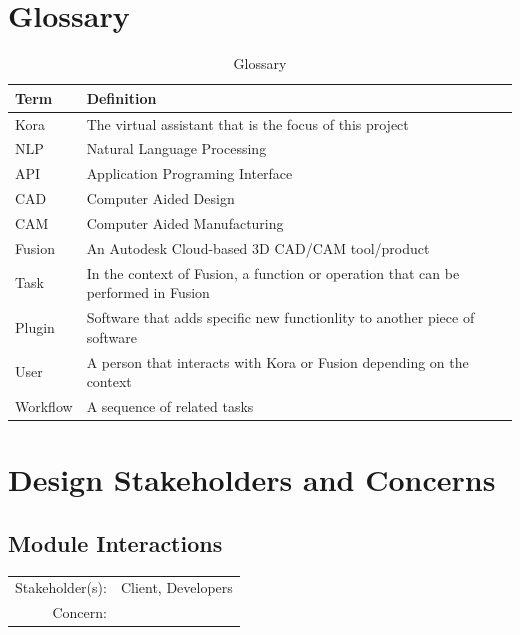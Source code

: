 \documentclass[onecolumn, draftclsnofoot,10pt, compsoc]{IEEEtran}
\newcommand{\designConcernDef}[3]{
    \subsection{#1}
        \begin{tabular}[t]{r p{6in}}
            Stakeholder(s): & #2 \\
            Concern: & #3 \\
        \end{tabular}
}
\begin{document}
\section{Glossary}
	\begin{table}[H]
		\centering
		\caption{Glossary}
		\label{my-label}
		\begin{tabular}{|l|l|}
			\hline
			\textbf{Term} & \textbf{Definition} \\ \hline
			Kora & The virtual assistant that is the focus of this project \\ \hline
			NLP & Natural Language Processing \\ \hline
			API & Application Programing Interface \\ \hline
			CAD & Computer Aided Design \\ \hline
			CAM & Computer Aided Manufacturing \\ \hline
			Fusion & An Autodesk Cloud-based 3D CAD/CAM tool/product \\ \hline
			Task & In the context of Fusion, a function or operation that can be performed in Fusion \\ \hline
			Plugin & Software that adds specific new functionlity to another piece of software \\ \hline
			User & A person that interacts with Kora or Fusion depending on the context \\ \hline
			Workflow & A sequence of related tasks \\ \hline
		\end{tabular}
	\end{table}

\section{Design Stakeholders and Concerns}
    \designConcernDef{Module Interactions}{Client, Developers}{}


%
%
%
\end{document}
